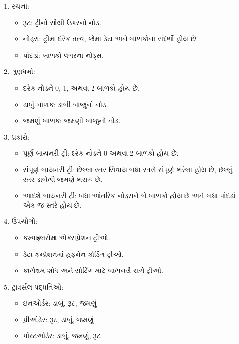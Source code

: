 \begin{enumerate}
\def\labelenumi{\arabic{enumi}.}
\tightlist
\item
  રચના:

  \begin{itemize}
  \tightlist
  \item
    રૂટ: ટ્રીનો સૌથી ઉપરનો નોડ.
  \item
    નોડ્સ: ટ્રીમાં દરેક તત્વ, જેમાં ડેટા અને બાળકોના સંદર્ભો હોય છે.
  \item
    પાંદડાં: બાળકો વગરના નોડ્સ.
  \end{itemize}
\item
  ગુણધર્મો:

  \begin{itemize}
  \tightlist
  \item
    દરેક નોડને 0, 1, અથવા 2 બાળકો હોય છે.
  \item
    ડાબું બાળક: ડાબી બાજુનો નોડ.
  \item
    જમણું બાળક: જમણી બાજુનો નોડ.
  \end{itemize}
\item
  પ્રકારો:

  \begin{itemize}
  \tightlist
  \item
    પૂર્ણ બાયનરી ટ્રી: દરેક નોડને 0 અથવા 2 બાળકો હોય છે.
  \item
    સંપૂર્ણ બાયનરી ટ્રી: છેલ્લા સ્તર સિવાય બધા સ્તરો સંપૂર્ણ ભરેલા હોય છે, છેલ્લું સ્તર
    ડાબેથી જમણે ભરાય છે.
  \item
    આદર્શ બાયનરી ટ્રી: બધા આંતરિક નોડ્સને બે બાળકો હોય છે અને બધા પાંદડાં એક જ સ્તરે
    હોય છે.
  \end{itemize}
\item
  ઉપયોગો:

  \begin{itemize}
  \tightlist
  \item
    કમ્પાइલરોમાં એક્સપ્રેશન ટ્રીઓ.
  \item
    ડેટા કમ્પ્રેશનમાં હફમેન કોડિંગ ટ્રીઓ.
  \item
    કાર્યક્ષમ શોધ અને સોર્ટિંગ માટે બાયનરી સર્ચ ટ્રીઓ.
  \end{itemize}
\item
  ટ્રાવર્સલ પદ્ધતિઓ:

  \begin{itemize}
  \tightlist
  \item
    ઇનઓર્ડર: ડાબું, રૂટ, જમણું
  \item
    પ્રીઓર્ડર: રૂટ, ડાબું, જમણું
  \item
    પોસ્ટઓર્ડર: ડાબું, જમણું, રૂટ
  \end{itemize}
\end{enumerate}


